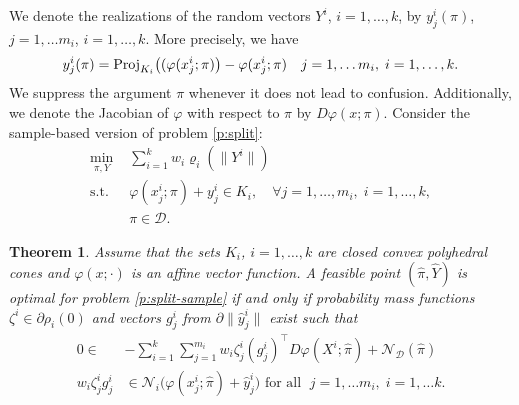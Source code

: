 \documentclass[10pt,letterpaper]{article}
\newcommand{\Dc}{\mathcal{D}}
\newcommand{\1}{1{\hskip -2.55 pt}\hbox{I}}
\newtheorem{theorem}{Theorem}
\begin{document}
We denote the realizations of the random vectors $Y^i$, $i=1,\dots, k$, by $y^i_j(\pi)$, $j=1,\dots m_i$, $i=1,\dots, k$. More precisely, we have
\[
y^i_j(\pi) = {\rm Proj}_{K_i}\big((\varphi(x^i_j;{\pi})\big)  - \varphi(x^i_j;{\pi})\quad j=1,\dots m_i,\; i=1,\dots, k. 
\]
We suppress the argument $\pi$ whenever it does not lead to confusion.
Additionally, we denote the Jacobian of $\varphi$ with respect to $\pi$ by $ D\varphi(x;{\pi})$. 
Consider the sample-based version of problem  \eqref{p:split}:
\begin{equation}
\label{p:split-sample}
\begin{aligned}
\min_{\pi,Y}\, &\,\sum_{i=1}^k w_i\varrho_i(\|Y^i\|)\\
\text{s.t. }  &\, \varphi(x^i_j;\pi)+y^i_j\in K_i, \quad \forall j=1,\dots, m_i,\; i=1,\dots, k,\\
&\, \pi\in\Dc.
\end{aligned} 
\end{equation}
\begin{theorem}
\label{t:opt-split-sample} 
Assume that the sets $K_i$, $i=1,\dots, k$ are closed convex polyhedral cones and $\varphi(x; \cdot)$ is an affine vector function. 
A feasible point $(\hat{\pi},\hat{Y})$ is optimal for problem \eqref{p:split-sample} if and only if probability mass functions  $\zeta^i\in \partial \rho_i (0)$ and vectors  $g^i_j$ from $\partial \|\hat{y}^i_j\|$ exist such that
\begin{align}
0\in & -\sum_{i=1}^k \sum_{j=1}^{m_i} w_i \zeta^i_j(g^i_j)^\top  D\varphi(X^i;\hat{\pi}) +\mathcal N_{\Dc}(\hat{\pi})\label{kkt-pi-f}\\
w_i\zeta^i_j g^i_j &\in \mathcal N_i\big(\varphi(x^i_j;\hat{\pi})+\hat{y}^i_j \big) \text{ for all }\; j=1,\dots m_i,\; i=1,\dots k. \label{compl-f}
\end{align}
\end{theorem} 
\end{document}
